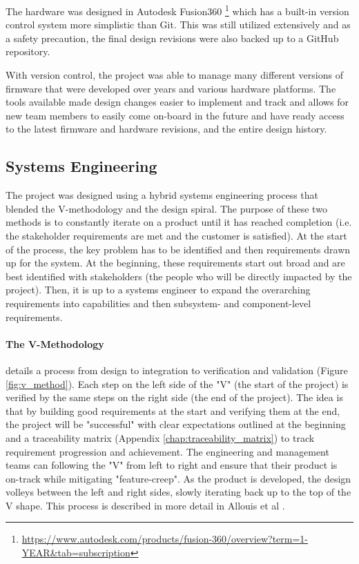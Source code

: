 The hardware was designed in Autodesk Fusion360 \footnote{\url{https://www.autodesk.com/products/fusion-360/overview?term=1-YEAR&tab=subscription}} which has a built-in version control system more simplistic than Git.
This was still utilized extensively and as a safety precaution, the final design revisions were also backed up to a GitHub repository.

With version control, the project was able to manage many different versions of firmware that were developed over years and various hardware platforms.
The tools available made design changes easier to implement and track and allows for new team members to easily come on-board in the future and have ready access to the latest firmware and hardware revisions, and the entire design history.

\subsection{Systems Engineering}
The project was designed using a hybrid systems engineering process that blended the V-methodology and the design spiral.
The purpose of these two methods is to constantly iterate on a product until it has reached completion (i.e. the stakeholder requirements are met and the customer is satisfied).
At the start of the process, the key problem has to be identified and then requirements drawn up for the system.
At the beginning, these requirements start out broad and are best identified with stakeholders (the people who will be directly impacted by the project).
Then, it is up to a systems engineer to expand the overarching requirements into capabilities and then subsystem- and component-level requirements.

\paragraph*{The V-Methodology} details a process from design to integration to verification and validation (Figure \ref{fig:v_method}).
Each step on the left side of the "V" (the start of the project) is verified by the same steps on the right side (the end of the project).
The idea is that by building good requirements at the start and verifying them at the end, the project will be "successful" with clear expectations outlined at the beginning and a traceability matrix (Appendix \ref{chap:traceability_matrix}) to track requirement progression and achievement.
The engineering and management teams can following the "V" from left to right and ensure that their product is on-track while mitigating "feature-creep".
As the product is developed, the design volleys between the left and right sides, slowly iterating back up to the top of the V shape.
This process is described in more detail in Allouis et al \cite{Allouis:2013}.


